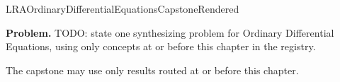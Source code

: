 \ifcsname LRAOrdinaryDifferentialEquationsCapstoneRendered\endcsname
\else
\expandafter\gdef\csname LRAOrdinaryDifferentialEquationsCapstoneRendered\endcsname{}

\newpage
{}
\label{cap:ordinary-differential-equations}

\begin{tcolorbox}[
  colback=gray!6,
  colframe=gray!40,
  arc=2pt,
  left=8pt, right=8pt, top=6pt, bottom=6pt,
  title={\small\textbf{Capstone Problem}},
  fonttitle=\small\bfseries
]
\textbf{Problem.}
TODO: state one synthesizing problem for Ordinary Differential Equations, using only concepts at or
before this chapter in the registry.
\end{tcolorbox}

\begin{remark*}
The capstone may use only results routed at or before this chapter.
\end{remark*}

\clearpage
\fi
